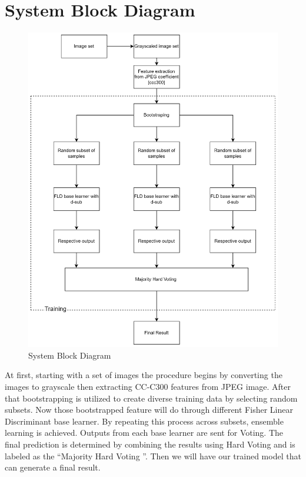 \section{System Block Diagram}
\begin{figure}[H]
    \centering
    \includegraphics[width=160mm]{./img/blockDiagram.png}
    \caption{System Block Diagram}
\end{figure}
\clearpage
\begin{flushleft}
At first, starting with a set of images the procedure begins by converting the images to grayscale then extracting CC-C300 features from JPEG image. After that bootstrapping is utilized to create diverse training data by selecting random subsets. Now those bootstrapped feature will do through different Fisher Linear Discriminant base learner. By repeating this process across subsets, ensemble learning is achieved.  Outputs from each base learner are sent for Voting. The final prediction is determined by combining the results using Hard Voting and is labeled as the ``Majority Hard Voting ''. Then we will have our trained model that can generate a final result.
\end{flushleft}
